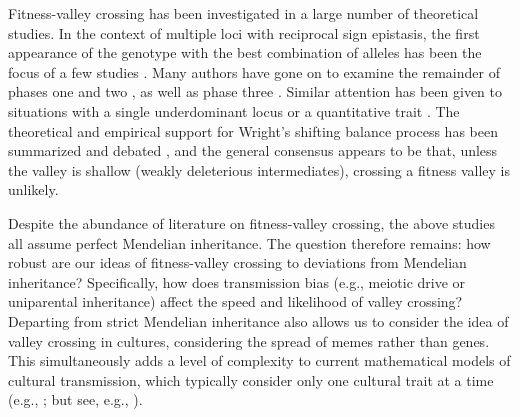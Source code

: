 \documentclass[review,3p,authoryear]{elsarticle}
\begin{document}
Fitness-valley crossing has been investigated in a large number of theoretical studies.
In the context of multiple loci with reciprocal sign epistasis, the first appearance of the genotype with the best combination of alleles has been the focus of a few studies \citep{Phillips1996,Christiansen1998,Hadany2003,Hadany2004,Weissman2009,Weissman2010}.
Many authors have gone on to examine the remainder of phases one and two \citep{Crow1965,Eshel1970,Karlin1971,Kimura1985,Barton1987,Kimura1990,Phillips1996,Michalakis1996,Stephan1996,Weinreich2005,Weissman2009,Weissman2010}, as well as phase three \citep{Kimura1990,Crow1990,Barton1992,Kondrashov1992,Phillips1993,Gavrilets1996,Hadany2003,Hadany2004}.
Similar attention has been given to situations with a single underdominant locus \citep{Slatkin1981,Gillespie1984a,Barton1993,Peck1998a} or a quantitative trait \citep{Lande1985c,Barton1987,Rouhani1987,Rouhani1987a,Charlesworth1988,Barton1993}.
The theoretical and empirical support for Wright's shifting balance process has been summarized and debated  \citep{Coyne1997,Wade1998,Coyne2000,Whitlock2000,Coyne2000,Goodnight2000,Goodnight2013}, and the general consensus appears to be that, unless the valley is shallow (weakly deleterious intermediates),  crossing a fitness valley is unlikely.

Despite the abundance of literature on fitness-valley crossing, the above studies all assume perfect Mendelian inheritance.
The question therefore remains: how robust are our ideas of fitness-valley crossing to deviations from Mendelian inheritance?
Specifically, how does transmission bias (e.g., meiotic drive or uniparental inheritance) affect the speed and likelihood of valley crossing?
Departing from strict Mendelian inheritance also allows us to consider the idea of valley crossing in cultures, considering the spread of memes \citep{Dawkins1976} rather than genes.
This simultaneously adds a level of complexity to current mathematical models of cultural transmission, which typically consider only one cultural trait at a time (e.g., \citealp{CavalliSforza1981}; but see, e.g.,  \citealp{Ihara2004,Creanza2012}).
\end{document}
